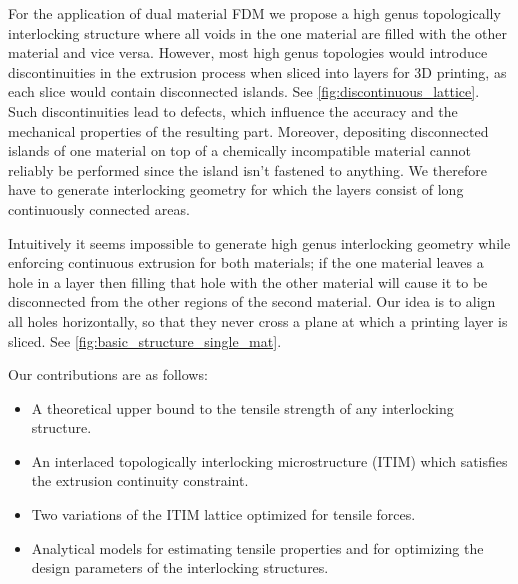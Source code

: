 For the application of dual material FDM we propose a high genus topologically interlocking structure where all voids in the one material are filled with the other material and vice versa.
However, most high genus topologies would introduce discontinuities in the extrusion process when sliced into layers for 3D printing, as each slice would contain disconnected islands.
See \cref{fig:discontinuous_lattice}.
Such discontinuities lead to defects, which influence the accuracy and the mechanical properties of the resulting part.
Moreover, depositing disconnected islands of one material on top of a chemically incompatible material cannot reliably be performed since the island isn't fastened to anything.
We therefore have to generate interlocking geometry for which the layers consist of long continuously connected areas.

Intuitively it seems impossible to generate high genus interlocking geometry while enforcing continuous extrusion for both materials;
if the one material leaves a hole in a layer then filling that hole with the other material will cause it to be disconnected from the other regions of the second material.
Our idea is to align all holes horizontally, so that they never cross a plane at which a printing layer is sliced.
See \cref{fig:basic_structure_single_mat}.


Our contributions are as follows:
\begin{itemize}
	\item A theoretical upper bound to the tensile strength of any interlocking structure.
	\item An interlaced topologically interlocking microstructure (ITIM) which satisfies the extrusion continuity constraint.
	\item Two variations of the ITIM lattice optimized for tensile forces.
	\item Analytical models for estimating tensile properties and for optimizing the design parameters of the interlocking structures.
\end{itemize}






